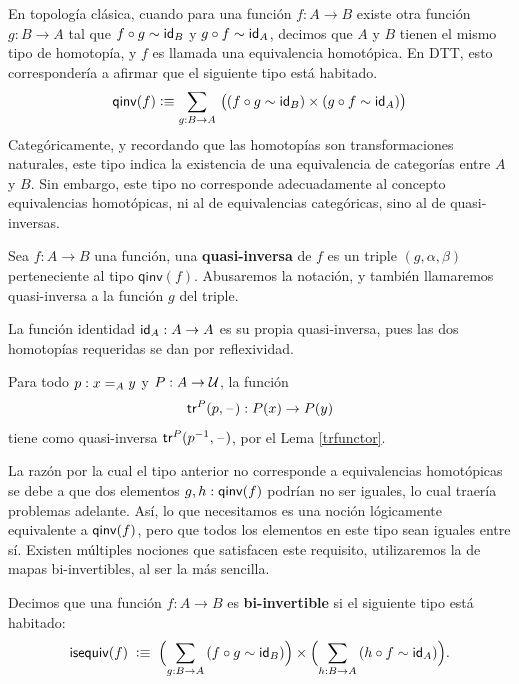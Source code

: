 \documentclass[../main.tex]{subfiles}
\begin{document}
En topolog\'ia cl\'asica, cuando para una funci\'on $f:A \to B$ existe otra funci\'on $g:B\to A$ tal que $f\circ g \htpy \idfunc[B]$ y $g\circ f \htpy \idfunc[A]$, decimos que $A$ y $B$ tienen el mismo tipo de homotop\'ia, y $f$ es llamada una equivalencia homot\'opica.
En DTT, esto corresponder\'ia a afirmar que el siguiente tipo est\'a habitado.
\begin{equation*}
  \mathsf{qinv}(f) \defeq \sm{g:B\to A} \big((f \circ g \htpy \idfunc[B]) \times (g\circ f \htpy \idfunc[A])\big)\label{eq:qinvtype}
\end{equation*}
Categ\'oricamente, y recordando que las homotop\'ias son transformaciones naturales, este tipo indica la existencia de una equivalencia de categor\'ias entre $A$ y $B$.
Sin embargo, este tipo no corresponde adecuadamente al concepto equivalencias homot\'opicas, ni al de equivalencias categ\'oricas, sino al de quasi-inversas.

\begin{definition}
  Sea $f:A\to B$ una funci\'on, una \textbf{quasi-inversa}
  de $f$ es un triple $(g,\alpha,\beta)$ perteneciente al tipo $\mathsf{qinv}(f)$.
  Abusaremos la notación, y tambi\'en llamaremos quasi-inversa a la función $g$ del triple.
\end{definition}

\begin{example}
  La función identidad $\idfunc[A]:A \to A$ es su propia quasi-inversa, pues las dos homotop\'ias requeridas se dan por reflexividad.
\end{example}

\begin{example}
  Para todo $p:\id[A]{x}{y}$ y $P:A \to \UU$, la función
  \[ \trfib{P}{p}{\blank} : P(x) \to P(y) \]
  tiene como quasi-inversa $\trfib{P}{p^{-1}}{\blank}$, por el Lema \ref{trfunctor}.
\end{example}

La raz\'on por la cual el tipo anterior no corresponde a equivalencias homot\'opicas se debe a que dos elementos $g,h:\qinv(f)$ podr\'ian no ser iguales, lo cual traer\'ia problemas adelante.
As\'i, lo que necesitamos es una noci\'on l\'ogicamente equivalente a $\qinv(f)$, pero que todos los elementos en este tipo sean iguales entre s\'i.
Existen m\'ultiples nociones que satisfacen este requisito, utilizaremos la de mapas bi-invertibles, al ser la m\'as sencilla.

\begin{definition}
  Decimos que una funci\'on $f:A\to B$ es \textbf{bi-invertible} si el siguiente tipo est\'a habitado:
  \begin{equation*}
    \isequiv(f) \;\defeq\;
    \Parens{\sm{g:B\to A} (f\circ g \htpy \idfunc[B])}
    \times
    \Parens{\sm{h:B\to A} (h\circ f \htpy \idfunc[A])}.
  \end{equation*}
\end{definition}
\end{document}
